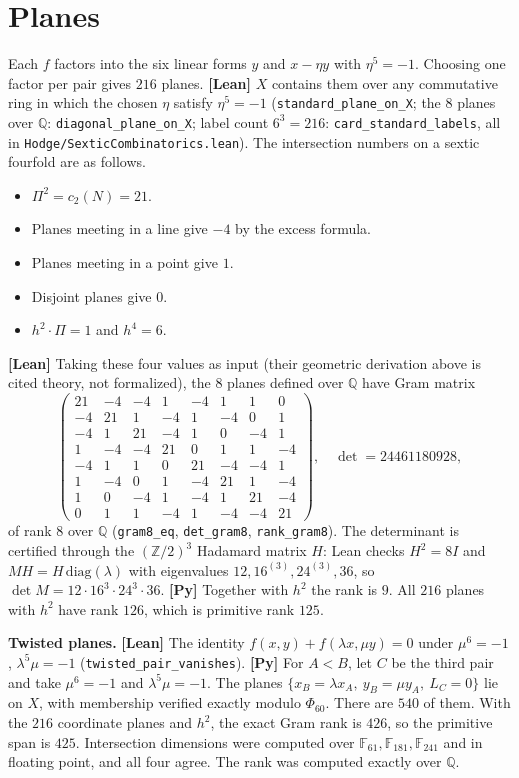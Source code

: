 \documentclass[11pt]{amsart}
\theoremstyle{remark}\newtheorem{remark}[theorem]{Remark}
\newcommand{\Q}{\mathbb{Q}}\newcommand{\PP}{\mathbb{P}}
\begin{document}
\section{Planes}
Each $f$ factors into the six linear forms $y$ and $x-\eta y$ with $\eta^5=-1$. Choosing one
factor per pair gives $216$ planes. \textbf{[Lean]} $X$ contains them over any commutative ring
in which the chosen $\eta$ satisfy $\eta^5=-1$ (\texttt{standard\_plane\_on\_X}; the $8$ planes over $\Q$:
\texttt{diagonal\_plane\_on\_X}; label count $6^3=216$: \texttt{card\_standard\_labels}, all in
\texttt{Hodge/SexticCombinatorics.lean}). The intersection numbers on a sextic fourfold are as follows.
\begin{itemize}
\item $\Pi^2=c_2(N)=21$.
\item Planes meeting in a line give $-4$ by the excess formula.
\item Planes meeting in a point give $1$.
\item Disjoint planes give $0$.
\item $h^2\cdot\Pi=1$ and $h^4=6$.
\end{itemize}
\textbf{[Lean]} Taking these four values as input (their geometric derivation above is cited
theory, not formalized), the $8$ planes defined over $\Q$ have Gram matrix
\[\left(\begin{smallmatrix}21&-4&-4&1&-4&1&1&0\\-4&21&1&-4&1&-4&0&1\\-4&1&21&-4&1&0&-4&1\\1&-4&-4&21&0&1&1&-4\\-4&1&1&0&21&-4&-4&1\\1&-4&0&1&-4&21&1&-4\\1&0&-4&1&-4&1&21&-4\\0&1&1&-4&1&-4&-4&21\end{smallmatrix}\right),\quad\det=24461180928,\]
of rank $8$ over $\Q$ (\texttt{gram8\_eq}, \texttt{det\_gram8}, \texttt{rank\_gram8}). The
determinant is certified through the $(\mathbb Z/2)^3$ Hadamard matrix $H$: Lean checks $H^2=8I$
and $MH=H\,\mathrm{diag}(\lambda)$ with eigenvalues $12,16^{(3)},24^{(3)},36$, so
$\det M=12\cdot16^3\cdot24^3\cdot36$. \textbf{[Py]} Together with $h^2$ the rank is $9$. All $216$ planes with $h^2$ have rank $126$,
which is primitive rank $125$.

\textbf{Twisted planes.} \textbf{[Lean]} The identity $f(x,y)+f(\lambda x,\mu y)=0$ under
$\mu^6=-1$, $\lambda^5\mu=-1$ (\texttt{twisted\_pair\_vanishes}). \textbf{[Py]} For $A<B$, let $C$ be the third pair and take
$\mu^6=-1$ and $\lambda^5\mu=-1$. The planes $\{x_B=\lambda x_A,\ y_B=\mu y_A,\ L_C=0\}$
lie on $X$, with membership verified exactly modulo $\Phi_{60}$. There are $540$ of them.
With the $216$ coordinate planes and $h^2$, the exact Gram rank is $426$, so the primitive
span is $425$. Intersection dimensions were computed over $\mathbb{F}_{61},\mathbb{F}_{181},\mathbb{F}_{241}$
and in floating point, and all four agree. The rank was computed exactly over $\Q$.
\end{document}
